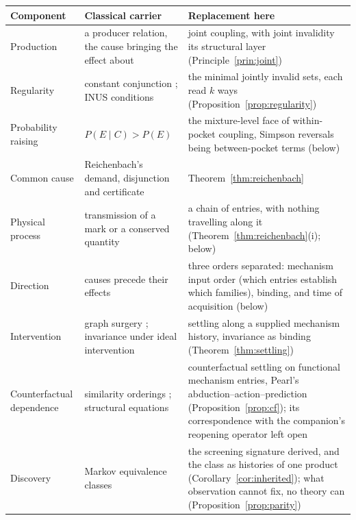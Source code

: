 \documentclass[11pt]{article}
\begin{document}
\begin{table}[!htbp]
\centering\small
\renewcommand{\arraystretch}{1.25}
\begin{tabular}{p{}p{}p{}}
\hline
\textbf{Component} & \textbf{Classical carrier} & \textbf{Replacement here} \\
\hline
Production & a producer relation, the cause bringing the effect about & joint coupling, with joint invalidity its structural layer (Principle~\ref{prin:joint}) \\
Regularity & constant conjunction \cite{hume1748enquiry}; INUS conditions \cite{mackie1965causes} & the minimal jointly invalid sets, each read $k$ ways (Proposition~\ref{prop:regularity}) \\
Probability raising & $P(E \mid C) > P(E)$ \cite{suppes1970probabilistic, eells1991probabilistic} & the mixture-level face of within-pocket coupling, Simpson reversals being between-pocket terms (below) \\
Common cause & Reichenbach's demand, disjunction and certificate & Theorem~\ref{thm:reichenbach} \\
Physical process & transmission of a mark or a conserved quantity \cite{salmon1984scientific, dowe2000physical} & a chain of entries, with nothing travelling along it (Theorem~\ref{thm:reichenbach}(i); below) \\
Direction & causes precede their effects & three orders separated: mechanism input order (which entries establish which families), binding, and time of acquisition (below) \\
Intervention & graph surgery \cite{pearl2009causality}; invariance under ideal intervention \cite{woodward2003making} & settling along a supplied mechanism history, invariance as binding (Theorem~\ref{thm:settling}) \\
Counterfactual dependence & similarity orderings \cite{lewis1973causation}; structural equations \cite{halpern2016actual} & counterfactual settling on functional mechanism entries, Pearl's abduction--action--prediction (Proposition~\ref{prop:cf}); its correspondence with the companion's reopening operator left open \cite{AethusSemantics} \\
Discovery & Markov equivalence classes \cite{verma1990equivalence, spirtes2000causation} & the screening signature derived, and the class as histories of one product (Corollary~\ref{cor:inherited}); what observation cannot fix, no theory can (Proposition~\ref{prop:parity}) \\

\end{tabular}
\end{table}
\end{document}
